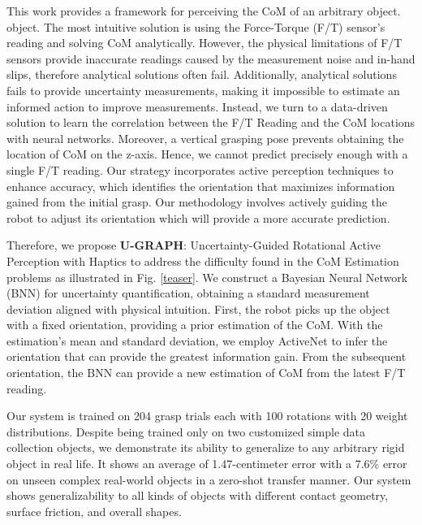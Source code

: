 This work provides a framework for perceiving the CoM of an arbitrary object. object. The most intuitive solution is using the Force-Torque (F/T) sensor's reading and solving CoM analytically. However, the physical limitations of F/T sensors provide inaccurate readings caused by the measurement noise and in-hand slips, therefore analytical solutions often fail. Additionally, analytical solutions fails to provide uncertainty measurements, making it impossible to estimate an informed action to improve measurements. Instead, we turn to a data-driven solution to learn the correlation between the F/T Reading and the CoM locations with neural networks. Moreover, a vertical grasping pose prevents obtaining the location of CoM on the z-axis. Hence, we cannot predict precisely enough with a single F/T reading. Our strategy incorporates active perception techniques to enhance accuracy, which identifies the orientation that maximizes information gained from the initial grasp. Our methodology involves actively guiding the robot to adjust its orientation which will provide a more accurate prediction. 

Therefore, we propose \textbf{U-GRAPH}: Uncertainty-Guided Rotational Active Perception with Haptics to address the difficulty found in the CoM Estimation problems as illustrated in Fig. \ref{teaser}. We construct a Bayesian Neural Network (BNN) \cite{1992bnn} for uncertainty quantification, obtaining a standard measurement deviation aligned with physical intuition. First, the robot picks up the object with a fixed orientation, providing a prior estimation of the CoM. With the estimation's mean and standard deviation, we employ ActiveNet to infer the orientation that can provide the greatest information gain. From the subsequent orientation, the BNN can provide a new estimation of CoM from the latest F/T reading. 

Our system is trained on 204 grasp trials each with 100 rotations with 20 weight distributions. Despite being trained only on two customized simple data collection objects, we demonstrate its ability to generalize to any arbitrary rigid object in real life. It shows an average of 1.47-centimeter error with a 7.6\% error on unseen complex real-world objects in a zero-shot transfer manner. Our system shows generalizability to all kinds of objects with different contact geometry, surface friction, and overall shapes. %



